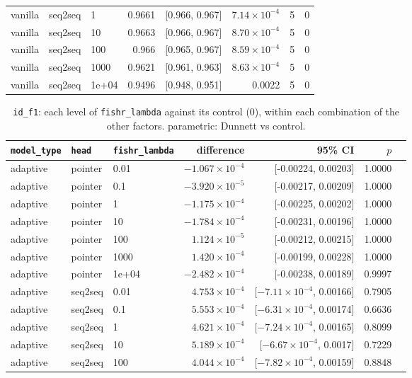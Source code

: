 \documentclass[10pt]{article}
\begin{document}
{\begin{longtable}{lllrlrrr}
vanilla & seq2seq & 1 & 0.9661 & [0.966, 0.967] & $7.14\times10^{-4}$ & 5 & 0\\
vanilla & seq2seq & 10 & 0.9663 & [0.966, 0.967] & $8.70\times10^{-4}$ & 5 & 0\\
vanilla & seq2seq & 100 & 0.966 & [0.965, 0.967] & $8.59\times10^{-4}$ & 5 & 0\\
vanilla & seq2seq & 1000 & 0.9621 & [0.961, 0.963] & $8.63\times10^{-4}$ & 5 & 0\\
vanilla & seq2seq & 1e+04 & 0.9496 & [0.948, 0.951] & 0.0022 & 5 & 0\\
\bottomrule
\end{longtable}
}

{\small
\begin{longtable}{lllrrrl}
\caption{\texttt{id\_f1}: each level of \texttt{fishr\_lambda} against its control (0), within each combination of the other factors. parametric: Dunnett vs control.}\label{tab:control-id_f1}\\
\toprule
\texttt{model\_type} & \texttt{head} & \texttt{fishr\_lambda} & difference & 95\% CI & $p$ & \\
\midrule
\endhead
adaptive & pointer & 0.01 & $-1.067\times10^{-4}$ & [-0.00224, 0.00203] & 1.0000 & \\
adaptive & pointer & 0.1 & $-3.920\times10^{-5}$ & [-0.00217, 0.00209] & 1.0000 & \\
adaptive & pointer & 1 & $-1.175\times10^{-4}$ & [-0.00225, 0.00202] & 1.0000 & \\
adaptive & pointer & 10 & $-1.784\times10^{-4}$ & [-0.00231, 0.00196] & 1.0000 & \\
adaptive & pointer & 100 & $1.124\times10^{-5}$ & [-0.00212, 0.00215] & 1.0000 & \\
adaptive & pointer & 1000 & $1.420\times10^{-4}$ & [-0.00199, 0.00228] & 1.0000 & \\
adaptive & pointer & 1e+04 & $-2.482\times10^{-4}$ & [-0.00238, 0.00189] & 0.9997 & \\
adaptive & seq2seq & 0.01 & $4.753\times10^{-4}$ & [$-7.11\times10^{-4}$, 0.00166] & 0.7905 & \\
adaptive & seq2seq & 0.1 & $5.553\times10^{-4}$ & [$-6.31\times10^{-4}$, 0.00174] & 0.6636 & \\
adaptive & seq2seq & 1 & $4.621\times10^{-4}$ & [$-7.24\times10^{-4}$, 0.00165] & 0.8099 & \\
adaptive & seq2seq & 10 & $5.189\times10^{-4}$ & [$-6.67\times10^{-4}$, 0.0017] & 0.7229 & \\
adaptive & seq2seq & 100 & $4.044\times10^{-4}$ & [$-7.82\times10^{-4}$, 0.00159] & 0.8848 & \\

\end{longtable}}
\end{document}
